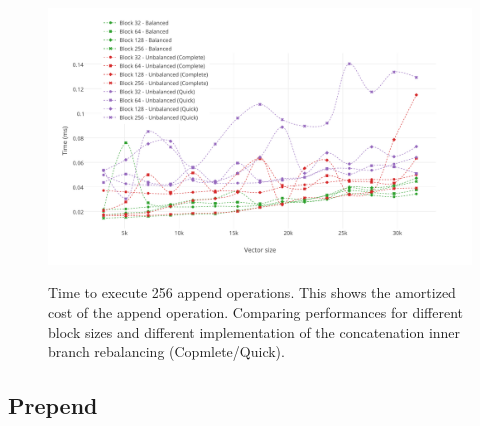 \begin{figure}[h!]
  \centering
  \includegraphics[width=\textwidth]{Benchmarks/Append_blocks_3.pdf}
  \label{IterationBlocksBenchmarks}
  \caption{Time to execute 256 append operations. This shows the amortized cost of the append operation. Comparing performances for different block sizes and different implementation of the concatenation inner branch rebalancing (Copmlete/Quick).}
\end{figure}

\subsection{Prepend}

